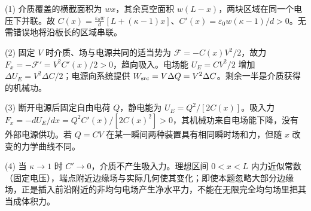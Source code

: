 (1) 介质覆盖的横截面积为 \(wx\)，其余真空面积 \(w(L-x)\)，两块区域在同一个电压下并联。故 \(\boxed{C(x)=\frac{\varepsilon_0w}{d}[L+(\kappa-1)x]}\)、\(C'(x)=\varepsilon_0w(\kappa-1)/d>0\)。无需错误地将沿板长的区域串联。

(2) 固定 \(V\) 时介质、场与电源共同的适当势为 \(\mathcal F=-C(x)V^2/2\)，故力 \(F_x=-\mathcal F'=V^2C'(x)/2>0\)，趋向吸入。电场能 \(U_E=C V^2/2\) 增加 \(\Delta U_E=V^2\Delta C/2\)；电源向系统提供 \(W_{\rm src}=V\Delta Q=V^2\Delta C\)。剩余一半是介质获得的机械功。

(3) 断开电源后固定自由电荷 \(Q\)，静电能为 \(U_E=Q^2/[2C(x)]\)。吸入力 \(\boxed{F_x=-dU_E/dx=Q^2C'(x)/[2C(x)^2]}>0\)，其机械功来自电场能下降，没有外部电源供功。若 \(Q=CV\) 在某一瞬间两种装置具有相同瞬时场和力，但随 \(x\) 改变的力学曲线不同。

(4) 当 \(\kappa\to1\) 时 \(C'\to0\)，介质不产生吸入力。理想区间 \(0<x<L\) 内力近似常数（固定电压），端点附近边缘场与实际几何使其变化；即使本题忽略大部分边缘场，正是插入前沿附近的非均匀电场产生净水平力，不能在无限完全均匀场里把其当成体积力。
